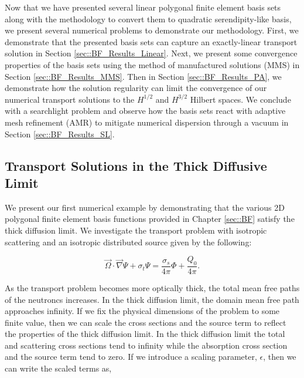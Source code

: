 Now that we have presented several linear polygonal finite element basis sets along with the methodology to convert them to quadratic serendipity-like basis, we present several numerical problems to demonstrate our methodology. First, we demonstrate that the presented basis sets can capture an exactly-linear transport solution in Section \ref{sec::BF_Results_Linear}. Next, we present some convergence properties of the basis sets using the method of manufactured solutions (MMS) in Section \ref{sec::BF_Results_MMS}. Then in Section \ref{sec::BF_Results_PA}, we demonstrate how the solution regularity can limit the convergence of our numerical transport solutions to the $H^{1/2}$ and $H^{3/2}$ Hilbert spaces. We conclude with a searchlight problem and observe how the basis sets react with adaptive mesh refinement (AMR) to mitigate numerical dispersion through a vacuum in Section \ref{sec::BF_Results_SL}.

\subsection{Transport Solutions in the Thick Diffusive Limit}
\label{sec::DSA_Results_TDL}

We present our first numerical example by demonstrating that the various 2D polygonal finite element basis functions provided in Chapter \ref{sec::BF} satisfy the thick diffusion limit. We investigate the transport problem with isotropic scattering and an isotropic distributed source given by the following:

\begin{equation}
\label{eq::BF_Results_TDL_trans_eq}
\vec{\Omega} \cdot \vec{\nabla} \Psi + \sigma_t \Psi =   \frac{\sigma_s}{4 \pi} \Phi +  \frac{Q_0}{4 \pi}.
\end{equation}

\noindent As the transport problem becomes more optically thick, the total mean free paths of the neutroncs increases. In the thick diffusion limit, the domain mean free path approaches infinity. If we fix the physical dimensions of the problem to some finite value, then we can scale the cross sections and the source term to reflect the properties of the thick diffusion limit. In the thick diffusion limit the total and scattering cross sections tend to infinity while the absorption cross section and the source term tend to zero. If we introduce a scaling parameter, $\epsilon$, then we can write the scaled terms as,

